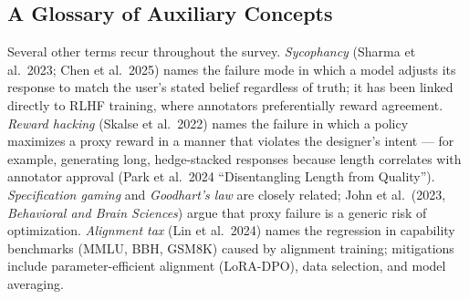 \documentclass{article}
\begin{document}
\subsection{A Glossary of Auxiliary Concepts}\label{a-glossary-of-auxiliary-concepts}

Several other terms recur throughout the survey. \emph{Sycophancy} (Sharma et al.~2023; Chen et al.~2025) names the failure mode in which a model adjusts its response to match the user's stated belief regardless of truth; it has been linked directly to RLHF training, where annotators preferentially reward agreement. \emph{Reward hacking} (Skalse et al.~2022) names the failure in which a policy maximizes a proxy reward in a manner that violates the designer's intent --- for example, generating long, hedge-stacked responses because length correlates with annotator approval (Park et al.~2024 ``Disentangling Length from Quality''). \emph{Specification gaming} and \emph{Goodhart's law} are closely related; John et al.~(2023, \emph{Behavioral and Brain Sciences}) argue that proxy failure is a generic risk of optimization. \emph{Alignment tax} (Lin et al.~2024) names the regression in capability benchmarks (MMLU, BBH, GSM8K) caused by alignment training; mitigations include parameter-efficient alignment (LoRA-DPO), data selection, and model averaging.
\end{document}
